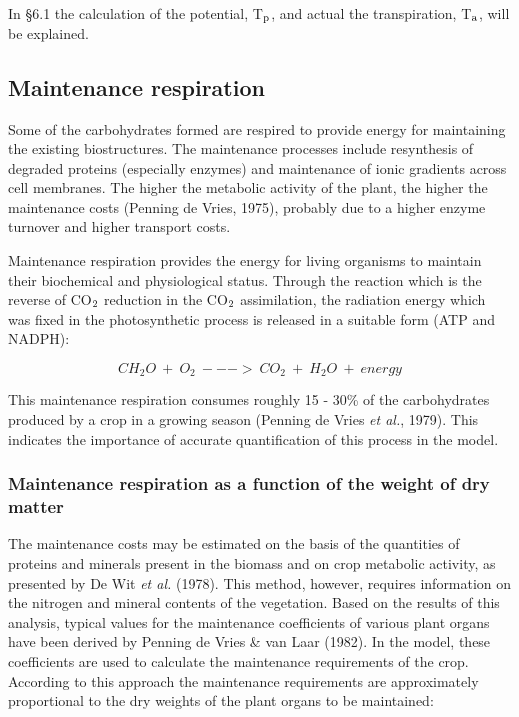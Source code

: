 In \S 6.1 the calculation of the potential, T$_{{\rm p}}$, and actual the transpiration, 
T$_{{\rm a}}$, will be explained.

\subsection{Maintenance respiration}

Some of the carbohydrates formed are respired to provide energy for maintaining the
existing biostructures. The maintenance processes include resynthesis of degraded proteins
(especially enzymes) and maintenance of ionic gradients across cell membranes. The
higher the metabolic activity of the plant, the higher the maintenance costs (Penning de
Vries, 1975), probably due to a higher enzyme turnover and higher transport costs.

Maintenance respiration provides the energy for living organisms to maintain their
biochemical and physiological status. Through the reaction which is the reverse of CO$_{{\rm 2}}$
reduction in the CO$_{{\rm 2}}$ assimilation, the radiation energy which was fixed in the
photosynthetic process is released in a suitable form (ATP and NADPH):

\begin{equation}
CH _{2} O ~+~ O _{2} ~--->~ CO _{2} ~+~ H _{2} O ~+~ energy
\end{equation}

This maintenance respiration consumes roughly 15 - 30\% of the carbohydrates produced
by a crop in a growing season (Penning de Vries {\it et al.}, 1979). This indicates the
importance of accurate quantification of this process in the model.

\subsubsection{Maintenance respiration as a function of the weight of dry matter}
The maintenance costs may be estimated on the basis of the quantities of proteins and
minerals present in the biomass and on crop metabolic activity, as presented by De Wit {\it et
al.} (1978). This method, however, requires information on the nitrogen and mineral
contents of the vegetation.
Based on the results of this analysis, typical values for the maintenance coefficients of
various plant organs have been derived by Penning de Vries \& van Laar (1982).
In the model, these coefficients are used to calculate the maintenance requirements of the
crop. According to this approach the maintenance requirements are approximately 
proportional to the dry weights of the plant organs to be maintained: 

